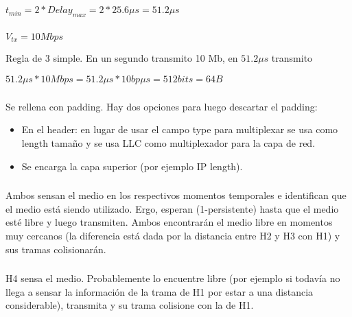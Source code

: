 \section{}

\subsection{}

\subsubsection{}
$t_{min} = 2 * Delay_{max} = 2 * 25.6 \mu s = 51.2 \mu s$

\subsubsection{}
$V_{tx} = 10 Mbps$

Regla de 3 simple. En un segundo transmito 10 Mb, en $51.2 \mu s$ transmito

$51.2 \mu s * 10Mbps = 51.2 \mu s * 10bp \mu s = 512bits = 64B$

\subsubsection{}
Se rellena con padding. Hay dos opciones para luego descartar el padding:

\begin{itemize}
\item En el header: en lugar de usar el campo type para multiplexar se usa como length tamaño y se usa LLC como multiplexador para la capa de red.
\item Se encarga la capa superior (por ejemplo IP length).
\end{itemize}

\subsubsection{}
Ambos sensan el medio en los respectivos momentos temporales e identifican que el medio está siendo utilizado. Ergo, esperan (1-persistente) hasta que el medio esté libre y luego transmiten. Ambos encontrarán el medio libre en momentos muy cercanos (la diferencia está dada por la distancia entre H2 y H3 con H1) y sus tramas colisionarán.

\subsubsection{}
H4 sensa el medio. Probablemente lo encuentre libre (por ejemplo si todavía no llega a sensar la información de la trama de H1 por estar a una distancia considerable), transmita y su trama colisione con la de H1.